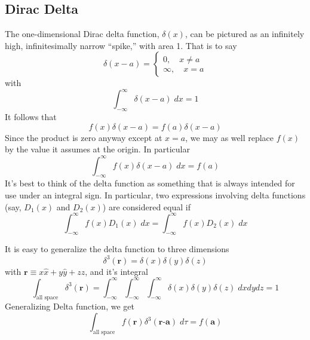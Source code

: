 \documentclass[../main.tex]{subfiles}
\begin{document}
\subsection{Dirac Delta}
The one-dimensional Dirac delta function, $\delta(x)$, can be pictured as an infinitely high, infinitesimally narrow “spike,” with area 1. That is to say
\begin{equation*}
    \delta (x-a)=\begin{cases}
        0,\quad  x\neq a\\
        \infty,\quad  x=a
    \end{cases}
\end{equation*}
with
\begin{equation*}
    \int_{-\infty}^{\infty} \delta (x-a)\;dx =1
\end{equation*}
It follows that
\begin{equation*}
    f(x)\delta(x-a)=f(a)\delta(x-a)
\end{equation*}
Since the product is zero anyway except at $x = a$, we may as well replace $f (x)$ by the value it assumes at the origin. In particular
\begin{equation*}
    \int_{-\infty}^{\infty}f(x)\delta(x-a)\;dx=f(a)
\end{equation*}
It's best to think of the delta function as something that is always intended for use under an integral sign. In particular, two expressions involving delta functions (say, $D_1(x)$ and $D_2(x)$) are considered equal if
\begin{equation*}
    \int_{-\infty}^{\infty}f(x)D_1(x)\;dx=\int_{-\infty}^{\infty}f(x)D_2(x)\;dx
\end{equation*}

It is easy to generalize the delta function to three dimensions
\begin{equation*}
    \delta^3(\textbf{r})=\delta (x)\delta (y)\delta(z)
\end{equation*}
with $\textbf{r} \equiv x \hat{x} + y\hat{y}+ z \hat{z}$, and it's integral
\begin{equation*}
    \int_{\text{all space}}\delta^3({\textbf{r}})=\int_{-\infty}^{\infty}\int_{-\infty}^{\infty}\int_{-\infty}^{\infty}\delta(x)\delta(y)\delta(z)\;dxdydz=1
\end{equation*}
Generalizing Delta function, we get
\begin{equation*}
    \int_{\text{all space}}f(\textbf{r})\delta^3({\textbf{r-a}})\;d\tau=f(\textbf{a})
\end{equation*}
\end{document}
